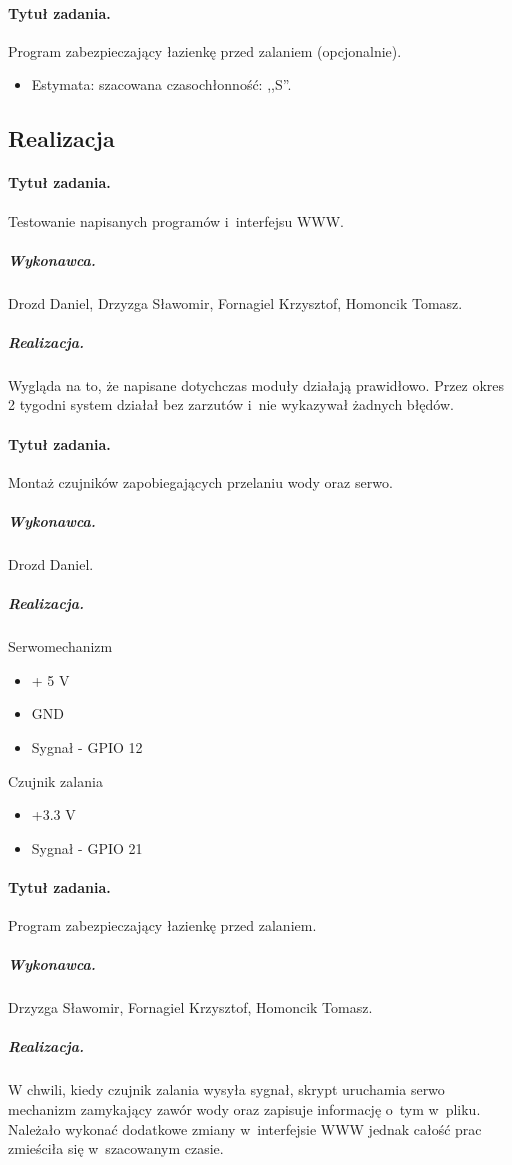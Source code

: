 \paragraph{Tytuł zadania.} Program zabezpieczający łazienkę przed zalaniem (opcjonalnie).
\begin{itemize}
	\item Estymata: szacowana czasochłonność: ,,S''.
\end{itemize}


\subsection{Realizacja}

\paragraph{Tytuł zadania.} Testowanie napisanych programów i~interfejsu WWW.
\subparagraph{Wykonawca.} Drozd Daniel, Drzyzga Sławomir, Fornagiel Krzysztof, Homoncik Tomasz.
\subparagraph{Realizacja.}
Wygląda na to, że napisane dotychczas moduły działają prawidłowo. Przez okres 2 tygodni system działał bez zarzutów i~nie wykazywał żadnych błędów.

\paragraph{Tytuł zadania.} Montaż czujników zapobiegających przelaniu wody oraz serwo.
\subparagraph{Wykonawca.} Drozd Daniel.
\subparagraph{Realizacja.} 
Serwomechanizm

\begin{itemize}
	\item + 5 V
	\item GND
	\item Sygnał - GPIO 12
\end{itemize}
Czujnik zalania
\begin{itemize}
	\item +3.3 V
	\item Sygnał - GPIO 21
\end{itemize}

\paragraph{Tytuł zadania.} Program zabezpieczający łazienkę przed zalaniem.
\subparagraph{Wykonawca.} Drzyzga Sławomir, Fornagiel Krzysztof, Homoncik Tomasz.
\subparagraph{Realizacja.} 
W chwili, kiedy czujnik zalania wysyła sygnał, skrypt uruchamia serwo mechanizm zamykający zawór wody oraz zapisuje informację o~tym w~pliku. Należało wykonać dodatkowe zmiany w~interfejsie WWW jednak całość prac zmieściła się w~szacowanym czasie.


